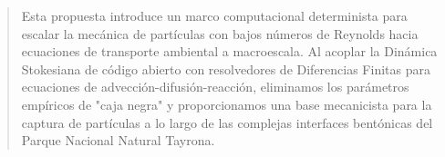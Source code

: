 \begin{abstract} Esta propuesta introduce un marco computacional determinista para escalar la mecánica de partículas con bajos números de Reynolds hacia ecuaciones de transporte ambiental a macroescala. Al acoplar la Dinámica Stokesiana de código abierto con resolvedores de Diferencias Finitas para ecuaciones de advección-difusión-reacción, eliminamos los parámetros empíricos de "caja negra" y proporcionamos una base mecanicista para la captura de partículas a lo largo de las complejas interfaces bentónicas del Parque Nacional Natural Tayrona.
\end{abstract}

